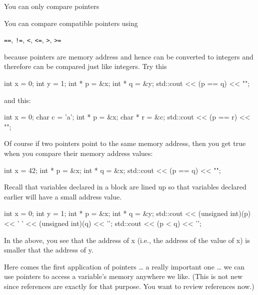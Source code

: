 You can only compare pointers 

You can compare compatible pointers using
\begin{center}
\texttt{==}, \texttt{!=}, \texttt{<}, \texttt{<=}, \texttt{>}, \texttt{>=}
\end{center}
because pointers are memory address and hence can be converted to integers and therefore can be compared just like integers. Try this

\begin{consolethree}[escapeinside=||]
int x = 0;
int y = 1;
int * p = &x;
int * q = &y;
std::cout << (p == q) << "\n";
\end{consolethree}

and this:

\begin{consolethree}[escapeinside=||]
int x = 0;
char c = 'a';
int * p = &x;
char * r = &c;
std::cout << (p == r) << "\n";
\end{consolethree}

Of course if two pointers point to the same memory address, then you get
true when you compare their memory address values:

\begin{consolethree}[escapeinside=||]
int x = 42;
int * p = &x;
int * q = &x;
std::cout << (p == q) << "\n";
\end{consolethree}

Recall that variables declared in a block are lined up so that variables declared earlier will have a small address value.

\begin{consolethree}[escapeinside=||]
int x = 0;
int y = 1;
int * p = &x;
int * q = &y;
std::cout << (unsigned int)(p) << ' '
          << (unsigned int)(q) << '\n';
std::cout << (p < q) << '\n';
\end{consolethree}
In the above, you see that the address of x (i.e., the address of the value of x) is smaller that the address of y.





\newpage{}

Here comes the first application of pointers \ldots{} a really important one \ldots{} we can use pointers to access a variable's memory anywhere we like. (This is not new since references are exactly for that purpose. You want to review references now.)

